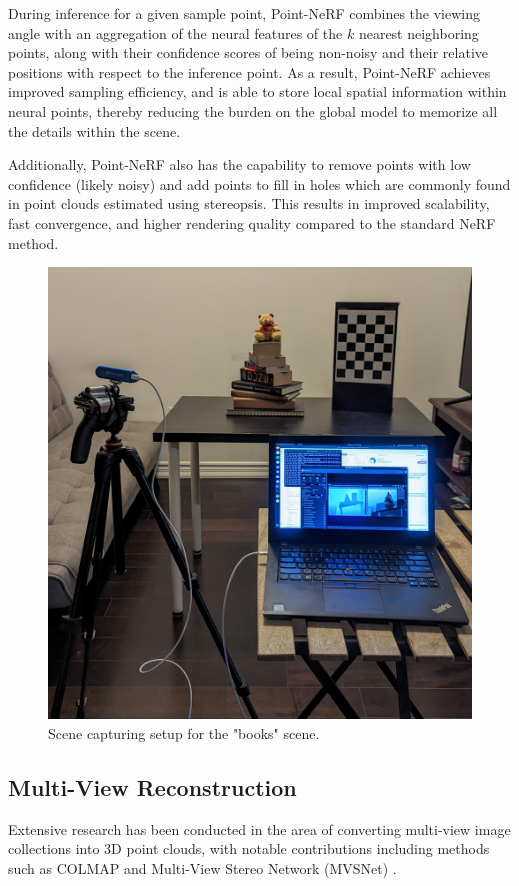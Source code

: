 \documentclass[10pt,twocolumn,letterpaper]{article}
\begin{document}
During inference for a given sample point, Point-NeRF combines the viewing angle with an aggregation of the neural features of the $k$ nearest neighboring points, along with their confidence scores of being non-noisy and their relative positions with respect to the inference point. As a result, Point-NeRF achieves improved sampling efficiency, and is able to store local spatial information within neural points, thereby reducing the burden on the global model to memorize all the details within the scene. 

Additionally, Point-NeRF also has the capability to remove points with low confidence (likely noisy) and add points to fill in holes which are commonly found in point clouds estimated using stereopsis. This results in improved scalability, fast convergence, and higher rendering quality compared to the standard NeRF method.


\begin{figure}[b]
  \centering
  \includegraphics[width=0.8\linewidth]{images/setup.jpg}
  \caption{Scene capturing setup for the "books" scene.}
   \label{fig:setup}
\end{figure}

\subsection{Multi-View Reconstruction}
Extensive research has been conducted in the area of converting multi-view image collections into 3D point clouds, with notable contributions including methods such as COLMAP \cite{COLMAP} and Multi-View Stereo Network (MVSNet) \cite{MVSNet}.
\end{document}
